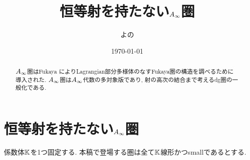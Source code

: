 \documentclass[uplatex, a4paper, 14Q, dvipdfmx]{jsarticle}
\title{恒等射を持たない\texorpdfstring{$A_{\infty}$}{Ainf}圏}
\author{よの}
\date{\today}
\begin{document}
\maketitle

\begin{abstract}
  $A_{\infty}$圏はFukaya \cite{Fuk93}\cite{Fuk96}によりLagrangian部分多様体のなすFukaya圏の構造を調べるために導入された. 
  $A_{\infty}$圏は$A_{\infty}$代数の多対象版であり, 射の高次の結合まで考えるdg圏の一般化である. 




\end{abstract}

\tableofcontents

\section{恒等射を持たない\texorpdfstring{$A_{\infty}$}{Ainf}圏} \label{section_non_unital_Ainf_cat}

係数体$\mathbb{K}$を1つ固定する. 
本稿で登場する圏は全て$\mathbb{K}$線形かつsmallであるとする. 
\end{document}
